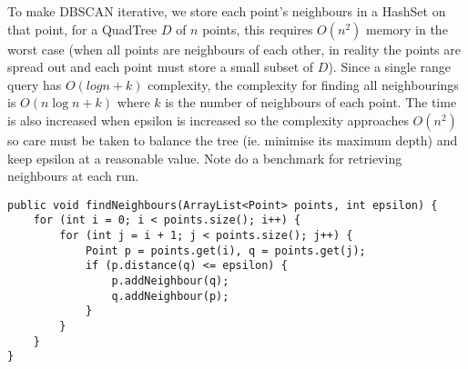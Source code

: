 \documentclass{CRPITStyle}
\begin{document}
To make DBSCAN iterative, we store each point's neighbours in a HashSet on that point, for a QuadTree $D$ of $n$ points, this requires $O(n^2)$ memory in the worst case (when all points are neighbours of each other, in reality the points are spread out and each point must store a small subset of $D$). Since a single range query has $O(log n + k)$ complexity, the complexity for finding all neighbourings is $O(n \log n + k)$ where $k$ is the number of neighbours of each point. The time is also increased when epsilon is increased so the complexity approaches $O(n^2)$ so care must be taken to balance the tree (ie. minimise its maximum depth) and keep epsilon at a reasonable value. Note do a benchmark for retrieving neighbours at each run.


\begin{lstlisting}[caption=A na\"{\i}ve implementation for calculating which points are neighbours]
public void findNeighbours(ArrayList<Point> points, int epsilon) {
    for (int i = 0; i < points.size(); i++) {
        for (int j = i + 1; j < points.size(); j++) {
            Point p = points.get(i), q = points.get(j);
            if (p.distance(q) <= epsilon) {
                p.addNeighbour(q);
                q.addNeighbour(p);
            }
        }
    }
}

\end{lstlisting}

  

\end{document}
